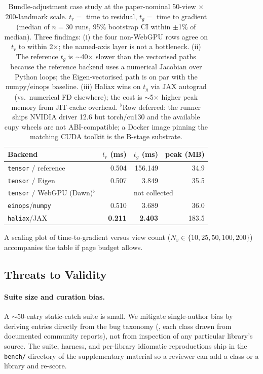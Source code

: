\documentclass[10pt,twocolumn]{article}
\newcommand{\code}[1]{\texttt{#1}}
\begin{document}
\begin{table}[t]
\centering\small
\begin{tabular}{@{}l rrr@{}}
\toprule
\textbf{Backend} & \textbf{$t_r$ (ms)} & \textbf{$t_g$ (ms)} & \textbf{peak (MB)} \\
\midrule
\code{tensor} / reference   & 0.504 & 156.149 &  34.9 \\
\code{tensor} / Eigen       & 0.507 & \phantom{0}\phantom{0}3.849 &  35.5 \\
\code{tensor} / WebGPU (Dawn)$^\flat$ & \multicolumn{3}{c}{not collected} \\
\code{einops}/\code{numpy}  & 0.510 & \phantom{0}\phantom{0}3.689 &  36.0 \\
\code{haliax}/JAX           & \textbf{0.211} & \phantom{0}\phantom{0}\textbf{2.403} & 183.5 \\
\bottomrule
\end{tabular}
\caption{Bundle-adjustment case study at the paper-nominal
50-view $\times$ 200-landmark scale. $t_r =$ time to residual,
$t_g =$ time to gradient (median of $n{=}30$ runs, 95\% bootstrap
CI within $\pm$1\% of median). Three findings: (i) the four
non-WebGPU rows agree on $t_r$ to within 2$\times$; the named-axis
layer is not a bottleneck. (ii) The reference $t_g$ is $\sim$40$\times$
slower than the vectorised paths because the reference backend uses
a numerical Jacobian over Python loops; the Eigen-vectorised path
is on par with the numpy/einops baseline. (iii) Haliax wins on $t_g$
via JAX autograd (vs.\ numerical FD elsewhere); the cost is
$\sim$5$\times$ higher peak memory from JIT-cache overhead.
$^\flat$Row deferred: the runner ships {NVIDIA} driver 12.6 but
{torch}/cu130 and the available {cupy} wheels are not ABI-compatible;
a Docker image pinning the matching CUDA toolkit is the B-stage
substrate.}
\label{tab:ba-results}
\end{table}

A scaling plot of time-to-gradient versus view count
($N_v \in \{10, 25, 50, 100, 200\}$) accompanies the table if page
budget allows.

\subsection{Threats to Validity}
\label{sec:eval-threats}

\paragraph{Suite size and curation bias.}
A $\sim$50-entry static-catch suite is small. We mitigate single-author
bias by deriving entries directly from the bug taxonomy
(, each class drawn from documented community
reports), not from inspection of any particular library's source.
The suite, harness, and per-library idiomatic reproductions ship in
the \code{bench/} directory of the supplementary material so a
reviewer can add a class or a library and re-score.
\end{document}
